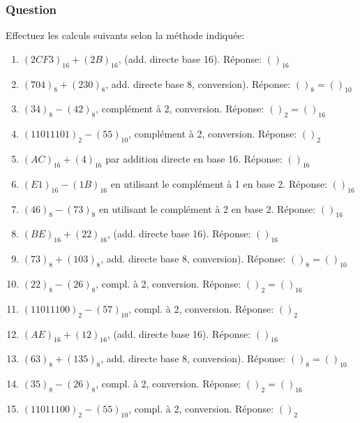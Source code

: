 \documentclass[11pt]{article}
\begin{document}
\subsubsection*{Question}
\label{sec:org35000ae}
Effectuez les calculs suivants selon la méthode indiquée:

\begin{enumerate}
\item \((2CF3)_{16} + (2B)_{16}\), (add. directe base 16). Réponse: \(( )_{16}\)

\item \((704)_{8} + (230)_{8}\), add. directe base 8, conversion). Réponse: \(( )_{8} = ( )_{10}\)

\item \((34)_{8} - (42)_{8}\), complément à 2, conversion. Réponse: \(( )_{2} = ( )_{16}\)

\item \((11011101)_{2} - (55)_{10}\), complément à 2, conversion. Réponse: \(( )_{2}\)

\item \((AC)_{16} + (4)_{16}\) par addition directe en base 16. Réponse: \(( )_{16}\)

\item \((E1)_{16} - (1B)_{16}\) en utilisant le complément à 1 en base 2. Réponse: \(( )_{16}\)

\item \((46)_{8} - (73)_{8}\) en utilisant le complément à 2 en base 2. Réponse: \(( )_{16}\)

\item \((BE)_{16} + (22)_{16}\), (add. directe base 16). Réponse: \(( )_{16}\)

\item \((73)_{8} + (103)_{8}\), add. directe base 8, conversion). Réponse: \(( )_{8} = ( )_{10}\)

\item \((22)_{8} - (26)_{8}\), compl. à 2, conversion. Réponse: \(( )_{2} = ( )_{16}\)

\item \((11011100)_{2} - (57)_{10}\), compl. à 2, conversion. Réponse: \(( )_{2}\)

\item \((AE)_{16} + (12)_{16}\), (add. directe base 16). Réponse: \(( )_{16}\)

\item \((63)_{8} + (135)_{8}\), add. directe base 8, conversion). Réponse: \(( )_{8} = ( )_{10}\)

\item \((35)_{8} - (26)_{8}\), compl. à 2, conversion. Réponse: \(( )_{2} = ( )_{16}\)

\item \((11011100)_{2} - (55)_{10}\), compl. à 2, conversion. Réponse: \(( )_{2}\)
\end{enumerate}
\end{document}
